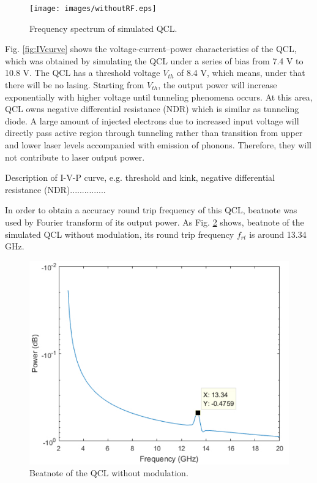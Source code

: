\documentclass[11pt,final]{scrbook}
\begin{document}
\begin{figure}[htbp]
\begin{center}
\texttt{[image: images/withoutRF.eps]}
\caption{Frequency spectrum of simulated QCL.}
\label{fig:withoutRF}
\end{center}
\end{figure}

Fig. \ref{fig:IVcurve} shows the voltage-current–power characteristics of the QCL, which was obtained by simulating the QCL under a series of bias from 7.4 V to 10.8 V. The QCL has a threshold voltage $V_{th}$ of 8.4 V, which means, under that there will be no lasing. Starting from $V_{th}$, the output power will increase exponentially with higher voltage until tunneling phenomena occurs. At this area, QCL owns negative differential resistance (NDR) which is similar as tunneling diode. A large amount of injected electrons due to increased input voltage will directly pass active region through tunneling rather than transition from upper and lower laser levels accompanied with emission of phonons. Therefore, they will not contribute to laser output power.

Description of I-V-P curve, e.g. threshold and kink, negative differential resistance (NDR)...............

In order to obtain a accuracy round trip frequency of this QCL, beatnote was used by Fourier transform of its output power. As Fig. \ref{fig:beatnote_noRF} shows,  beatnote of the simulated QCL without modulation, its round trip frequency $f_{rt}$ is around 13.34 GHz.
\begin{figure}[htbp]
\begin{center}
\includegraphics[scale=0.8]{images/beatnote_noRF.pdf}
\caption{Beatnote of the QCL without modulation.}
\label{fig:beatnote_noRF}
\end{center}
\end{figure}
\end{document}
